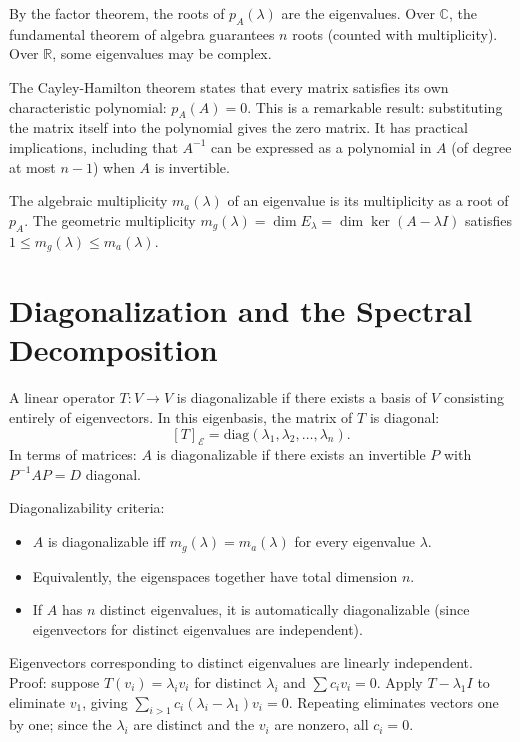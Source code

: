 \documentclass[11pt]{article}
\begin{document}
By the factor theorem, the roots of $p_A(\lambda)$ are the eigenvalues. Over $\mathbb{C}$, the fundamental theorem of algebra guarantees $n$ roots (counted with multiplicity). Over $\mathbb{R}$, some eigenvalues may be complex.

The Cayley-Hamilton theorem states that every matrix satisfies its own characteristic polynomial: $p_A(A) = 0$. This is a remarkable result: substituting the matrix itself into the polynomial gives the zero matrix. It has practical implications, including that $A^{-1}$ can be expressed as a polynomial in $A$ (of degree at most $n-1$) when $A$ is invertible.

The algebraic multiplicity $m_a(\lambda)$ of an eigenvalue is its multiplicity as a root of $p_A$. The geometric multiplicity $m_g(\lambda) = \dim E_\lambda = \dim \ker(A - \lambda I)$ satisfies $1 \leq m_g(\lambda) \leq m_a(\lambda)$.

\section*{Diagonalization and the Spectral Decomposition}

A linear operator $T: V \to V$ is diagonalizable if there exists a basis of $V$ consisting entirely of eigenvectors. In this eigenbasis, the matrix of $T$ is diagonal:
\[
[T]_\mathcal{E} = \text{diag}(\lambda_1, \lambda_2, \ldots, \lambda_n).
\]
In terms of matrices: $A$ is diagonalizable if there exists an invertible $P$ with $P^{-1}AP = D$ diagonal.

Diagonalizability criteria:
\begin{itemize}
  \item $A$ is diagonalizable iff $m_g(\lambda) = m_a(\lambda)$ for every eigenvalue $\lambda$.
  \item Equivalently, the eigenspaces together have total dimension $n$.
  \item If $A$ has $n$ distinct eigenvalues, it is automatically diagonalizable (since eigenvectors for distinct eigenvalues are independent).
\end{itemize}

Eigenvectors corresponding to distinct eigenvalues are linearly independent. Proof: suppose $T(v_i) = \lambda_i v_i$ for distinct $\lambda_i$ and $\sum c_i v_i = 0$. Apply $T - \lambda_1 I$ to eliminate $v_1$, giving $\sum_{i>1} c_i (\lambda_i - \lambda_1) v_i = 0$. Repeating eliminates vectors one by one; since the $\lambda_i$ are distinct and the $v_i$ are nonzero, all $c_i = 0$.
\end{document}
